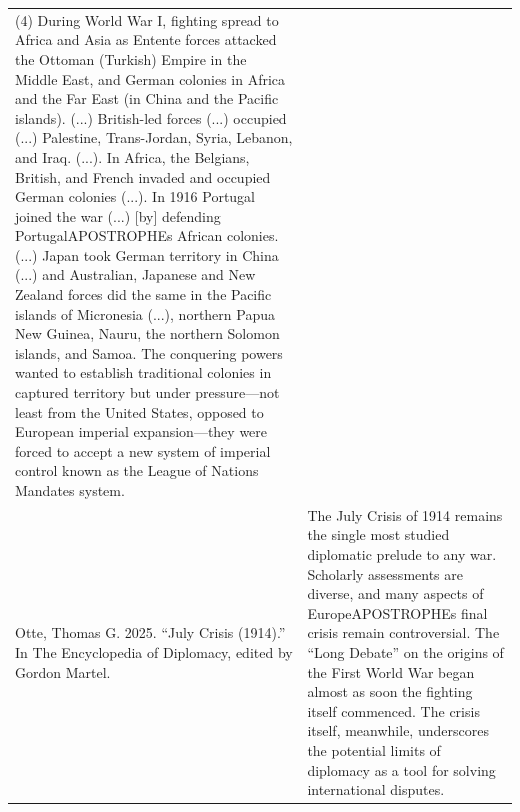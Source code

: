 {\begin{longtable}{p{}p{}}
(4) During World War I, fighting spread to Africa and Asia as Entente forces attacked the Ottoman (Turkish) Empire in the Middle East, and German colonies in Africa and the Far East (in China and the Pacific islands). (...) British-led forces (...) occupied (...) Palestine, Trans-Jordan, Syria, Lebanon, and Iraq. (...). In Africa, the Belgians, British, and French invaded and occupied German colonies (...). In 1916 Portugal joined the war (...) [by] defending PortugalAPOSTROPHEs African colonies. (...) Japan took German territory in China (...) and Australian, Japanese and New Zealand forces did the same in the Pacific islands of Micronesia (...), northern Papua New Guinea, Nauru, the northern Solomon islands, and Samoa. The conquering powers wanted to establish traditional colonies in captured territory but under pressure—not least from the United States, opposed to European imperial expansion—they were forced to accept a new system of imperial control known as the League of Nations Mandates system.
\\
Otte, Thomas G. 2025. “July Crisis (1914).” In The Encyclopedia of Diplomacy, edited by Gordon Martel. & The July Crisis of 1914 remains the single most studied diplomatic prelude to any war. Scholarly assessments are diverse, and many aspects of EuropeAPOSTROPHEs final crisis remain controversial. The “Long Debate” on the origins of the First World War began almost as soon the fighting itself commenced. The crisis itself, meanwhile, underscores the potential limits of diplomacy as a tool for solving international disputes.

\end{longtable}}
